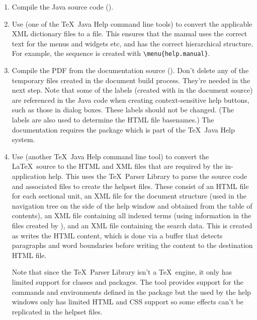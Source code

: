 \begin{enumerate}
\item Compile the Java source code ().

\item Use  (one of the \TeX\ Java Help command
line tools) to convert the applicable XML dictionary files to 
a  file. This ensures that the manual uses the
correct text for the menus and widgets etc, and has the correct
hierarchical structure. For example, the sequence
 is created with
\verb|\menu{help.manual}|.

\item Compile the PDF from the documentation source
(). Don't delete any of the temporary
files created in the document build process. They're needed in the
next step. Note that some of the labels (created with 
in the document source) are referenced in the Java code when
creating context-sensitive help buttons, such as those in dialog
boxes. These labels should not be changed. (The labels are also used
to determine the HTML file basenames.)
The documentation requires the  package which is
part of the \TeX\ Java Help system.

\item Use  (another \TeX\ Java Help command
line tool) to convert the \LaTeX\ source to the HTML and XML files
that are required by the in-application help.
This uses the \TeX\ Parser Library to parse the source code and 
associated files to create the helpset files. These consist of an
HTML file for each sectional unit, an XML file for the document
structure (used in the navigation tree on the side of the help
window and obtained from the table of contents), 
an XML file containing all indexed terms (using
information in the files created by ), and
an XML file containing the search data. This is created as
 writes the HTML content, which is done via a
buffer that detects paragraphs and word boundaries before writing
the content to the destination HTML file.

Note that since the \TeX\ Parser Library isn't a \TeX\ engine, it
only has limited support for classes and packages. The
 tool provides support for the commands and
environments defined in the  package but
the  used by the help windows only has limited
HTML and CSS support so some effects can't be replicated in the
helpset files.

\end{enumerate}


